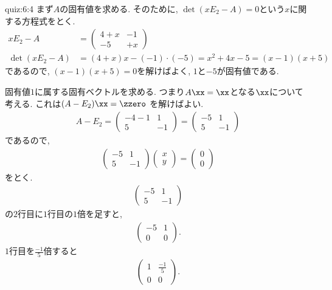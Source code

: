 \begin{answerof}{quiz:6:4}
  まず$A$の固有値を求める.
  そのために, $\det(xE_2-A)=0$という$x$に関する方程式をとく.
  \begin{align*}
    xE_2-A&=\begin{pmatrix}4+x&-1\\-5&+x\end{pmatrix}\\
    \det(xE_2-A)&=(4+x)x-(-1)\cdot (-5)=x^2+4x-5=(x-1)(x+5)
  \end{align*}
  であるので, $(x-1)(x+5)=0$を解けばよく,
  $1$と$-5$が固有値である.

  固有値$1$に属する固有ベクトルを求める.
  つまり$A\xx=\xx$となる$\xx$について考える.
  これは$(A-E_2)\xx=\zzero$
  を解けばよい.
  \begin{align*}
    A-E_2=\begin{pmatrix}-4-1&1\\5&-1\end{pmatrix}
    =\begin{pmatrix}-5&1\\5&-1\end{pmatrix}
  \end{align*}
  であるので,
  \begin{align*}
    \begin{pmatrix}-5&1\\5&-1\end{pmatrix}
    \begin{pmatrix}x\\y\end{pmatrix}=
    \begin{pmatrix}0\\0\end{pmatrix}
  \end{align*}
  をとく.
  \begin{align*}
    \begin{pmatrix}-5&1\\5&-1\end{pmatrix}
  \end{align*}
  の$2$行目に$1$行目の$1$倍を足すと,
 \begin{align*}
    \begin{pmatrix}-5&1\\0&0\end{pmatrix}.
  \end{align*}
 $1$行目を$\frac{-1}{5}$倍すると
 \begin{align*}
    \begin{pmatrix}1&\frac{-1}{5}\\0&0\end{pmatrix}.

\end{align*}
\end{answerof}
